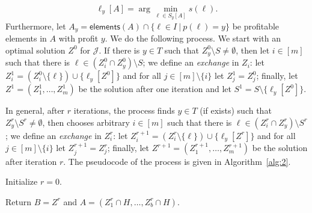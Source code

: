 {\begin{equation}
	\label{item}
	\ell_y[A] = \arg \min_{\ell \in S_y[A]} s(\ell). 
\end{equation} Furthermore, let $A_y = \textsf{elements}(A) \cap \{\ell \in I ~|~p(\ell) = y\}$ be profitable elements in $A$ with profit $y$. We do the following process. We start with an optimal solution $Z^0$ for $\mathcal{J}$. If there is $y \in T$ such that $Z^0_y \setminus S \neq \emptyset$, then let  $i \in [m]$ such that there is $\ell \in (Z^0_i \cap Z^0_y) \setminus S$; we define an {\em exchange} in $Z_i$: let $Z^1_i = (Z^0_i \setminus \{\ell\}) \cup \{\ell_y[Z^0]\}$ and for all $j \in [m] \setminus \{i\}$ let $Z^1_j = Z^0_j$; finally, let $Z^1 = (Z^1_1, \ldots, Z^1_m)$ be the solution after one iteration and let $S^1 = S \setminus \{\ell_y[Z^0]\}$.

In general, after $r$ iterations, the process finds $y \in T$ (if exists) such that $Z^r_y \setminus S^{r} \neq \emptyset$, then chooses arbitrary $i \in [m]$ such that there is $\ell \in (Z^{r}_i \cap Z^{r}_y) \setminus S^{r}$; we define an {\em exchange} in $Z^r_i$: let $Z^{r+1}_i = (Z^{r}_i \setminus \{\ell\}) \cup \{\ell_y[Z^{r}]\}$ and for all $j \in [m] \setminus \{i\}$ let $Z^{r+1}_j = Z^r_j$; finally, let $Z^{r+1} = (Z^{r+1}_1, \ldots, Z^{r+1}_m)$ be the solution after iteration $r$. The pseudocode of the process is given in Algorithm~\ref{alg:2}. 

\begin{algorithm}[h]
	\caption{$\textsf{solution}(\cJ, Z^0)$}
	\label{alg:2}
	
	Initialize $r = 0$. 
	
	
	
	Return $B = Z^r$ and $A = (Z^r_1 \cap H, \ldots, Z^r_b \cap H)$. 
	
\end{algorithm}


}

